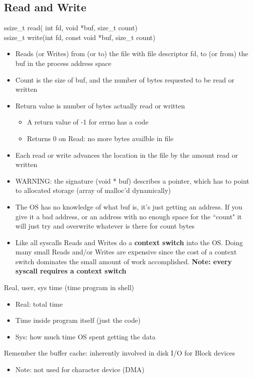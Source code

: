 \subsection{Read and Write}
ssize\_t read( int fd, void *buf, size\_t count)\\
ssize\_t write(int fd, const void *buf, size\_t count)
\begin{itemize}
    \item Reads (or Writes) from (or to) the file with file descriptor fd, to (or from) the buf in the process address space
    \item Count is the size of buf, and the number of bytes requested to be read or written
    \item Return value is number of bytes actually read or written
    \begin{itemize}
        \item A return value of -1 for errno has a code
        \item Returns 0 on Read: no more bytes availble in file
    \end{itemize}
    \item Each read or write advances the location in the file by the amount read or written
    \item WARNING: the signature (void * buf) describes a pointer, which has to point to allocated storage (array of malloc'd dynamically)
    \item The OS has no knowledge of what buf is, it's just getting an address. If you give it a bad address, or an address with no enough space for the ``count" it will just try and overwrite whatever is there for count bytes
    \item Like all syscalls Reads and Writes do a \textbf{context switch} into the OS. Doing many small Reads and/or Writes are expensive since the cost of a context switch dominates the small amount of work accomplished. \textbf{Note: every syscall requires a context switch}
\end{itemize}
Real, user, sys time (time program in shell)
\begin{itemize}
    \item Real: total time
    \item Time inside program itself (just the code)
    \item Sys: how much time OS spent getting the data
\end{itemize}
Remember the buffer cache: inherently involved in disk I/O for Block devices
\begin{itemize}
    \item Note: not used for character device (DMA)
\end{itemize}
